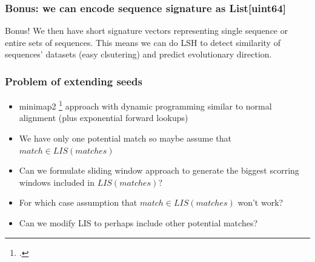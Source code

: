 \begin{frame}[fragile]
  \frametitle{Bonus: we can encode sequence signature as List[uint64]}
  \begin{exampleblock}{Bonus!}\tiny
    We then have short signature vectors representing single sequence or entire sets of sequences.
    This means we can do LSH to detect similarity of sequences' datasets (easy clsutering) and predict evolutionary direction.
  \end{exampleblock}
\end{frame}

\begin{frame}
  \frametitle{Problem of extending seeds}

  \begin{itemize}
    \item minimap2 \footcite{minimap2} approach with dynamic programming similar to normal alignment (plus exponential forward lookups)
    \item We have only one potential match so maybe assume that $match \in LIS(matches)$
    \item Can we formulate sliding window approach to generate the biggest scorring windows included in $LIS(matches)$?
    \item For which case assumption that $match \in LIS(matches)$ won't work?
    \item Can we modify LIS to perhaps include other potential matches?
  \end{itemize}
\end{frame}

